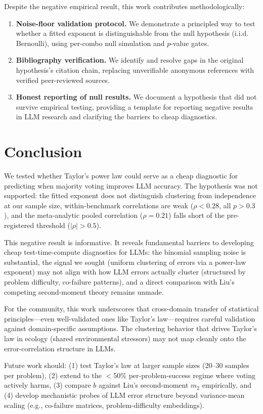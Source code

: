 \documentclass[11pt,letterpaper]{article}
\begin{document}
Despite the negative empirical result, this work contributes methodologically:

\begin{enumerate}
  \item \textbf{Noise-floor validation protocol.} We demonstrate a principled way to test whether a fitted exponent is distinguishable from the null hypothesis (i.i.d. Bernoulli), using per-combo null simulation and $p$-value gates.
  \item \textbf{Bibliography verification.} We identify and resolve gaps in the original hypothesis's citation chain, replacing unverifiable anonymous references with verified peer-reviewed sources.
  \item \textbf{Honest reporting of null results.} We document a hypothesis that did not survive empirical testing, providing a template for reporting negative results in LLM research and clarifying the barriers to cheap diagnostics.
\end{enumerate}

\section{Conclusion}

We tested whether Taylor's power law could serve as a cheap diagnostic for predicting when majority voting improves LLM accuracy. The hypothesis was not supported: the fitted exponent does not distinguish clustering from independence at our sample size, within-benchmark correlations are weak ($\rho < 0.28$, all $p > 0.3$), and the meta-analytic pooled correlation ($\rho = 0.21$) falls short of the pre-registered threshold ($|\rho| > 0.5$).

This negative result is informative. It reveals fundamental barriers to developing cheap test-time-compute diagnostics for LLMs: the binomial sampling noise is substantial, the signal we sought (uniform clustering of errors via a power-law exponent) may not align with how LLM errors actually cluster (structured by problem difficulty, co-failure patterns), and a direct comparison with Liu's competing second-moment theory remains unmade.

For the community, this work underscores that cross-domain transfer of statistical principles---even well-validated ones like Taylor's law---requires careful validation against domain-specific assumptions. The clustering behavior that drives Taylor's law in ecology (shared environmental stressors) may not map cleanly onto the error-correlation structure in LLMs.

Future work should: (1) test Taylor's law at larger sample sizes (20--30 samples per problem), (2) extend to the $<50\%$ per-problem-success regime where voting actively harms, (3) compare $b$ against Liu's second-moment $m_2$ empirically, and (4) develop mechanistic probes of LLM error structure beyond variance-mean scaling (e.g., co-failure matrices, problem-difficulty embeddings).



\end{document}
